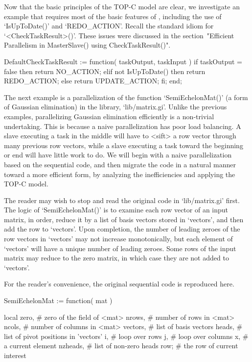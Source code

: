 
Now that the basic principles of the TOP-C model are clear, we
investigate an example that requires most of the basic features of
{\ParGAP}, including the use of `IsUpToDate()' and
`REDO_ACTION'.  Recall the standard idiom for
`<CheckTaskResult>()'.  These issues were discussed in
the section~"Efficient Parallelism in MasterSlave() using CheckTaskResult()".

\begintt
DefaultCheckTaskResult := function( taskOutput, taskInput )
  if taskOutput = false then return NO_ACTION;
  elif not IsUpToDate() then return REDO_ACTION;
  else return UPDATE_ACTION;
  fi;
end;
\endtt

The next example is a parallelization of the function
`SemiEchelonMat()' (a form of Gaussian elimination) in the {\GAP}
library, `lib/matrix.gi'.  Unlike the previous examples, parallelizing
Gaussian elimination efficiently is a non-trivial undertaking.  This
is because a naive parallelization has poor load balancing.  A slave
executing a task in the middle will have to <sift> a row vector
through many previous row vectors, while a slave executing a task
toward the beginning or end will have little work to do.  We will
begin with a naive parallelization based on the sequential code, and
then migrate the code in a natural manner toward a more efficient
form, by analyzing the inefficiencies and applying the TOP-C model.

The reader may wish to stop and read the original code in
`lib/matrix.gi' first.  The logic of `SemiEchelonMat()' is to examine
each row vector of an input matrix, in order, reduce it by a list of
basis vectors stored in `vectors', and then add the row to `vectors'.
Upon completion, the number of leading zeroes of the row vectors in
`vectors' may not increase monotonically, but each element of
`vectors' will have a unique number of leading zeroes.  Some rows of
the input matrix may reduce to the zero matrix, in which case they are
not added to `vectors'.

For the reader's convenience, the original sequential code is
reproduced here.

\beginexample
SemiEchelonMat := function( mat )

    local zero,      # zero of the field of <mat>
          nrows,     # number of rows in <mat>
          ncols,     # number of columns in <mat>
          vectors,   # list of basis vectors
          heads,     # list of pivot positions in 'vectors'
          i,         # loop over rows
          j,         # loop over columns
          x,         # a current element
          nzheads,   # list of non-zero heads
          row;       # the row of current interest


